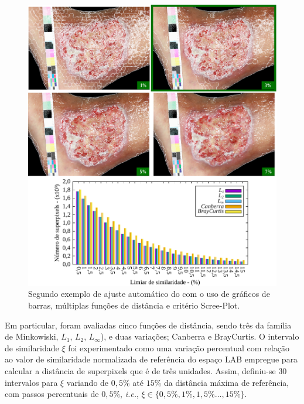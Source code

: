 \begin{figure}[!b]
\centering
\includegraphics[scale=.93]{_fig/res2.pdf}
\caption[Segundo exemplo de ajuste automático do \system com o uso de gráficos de barras e critério Scree-Plot.]{Segundo exemplo de ajuste automático do \system com o uso de gráficos de barras, múltiplas funções de distância e critério Scree-Plot.}
\label{fig:expto_dbscan2}
\end{figure}

Em particular, foram avaliadas cinco funções de distância, sendo três da família de Minkowiski, $L_1$, $L_2$, $L_\infty$), e duas variações; Canberra e BrayCurtis. 
O intervalo de similaridade $\xi$ foi experimentado como uma variação percentual com relação ao valor de similaridade normalizada de referência do espaço LAB empregue para calcular a distância de superpixels que é de três unidades.
Assim, definiu-se $30$ intervalos para $\xi$ variando de $ 0,5\%$ até $15\%$ da distância máxima de referência, com passos percentuais de $0,5\%$, \textit{i.e.}, $\xi \in \{0,5\%, 1\%, 1,5\% \ldots, 15\% \}$.

